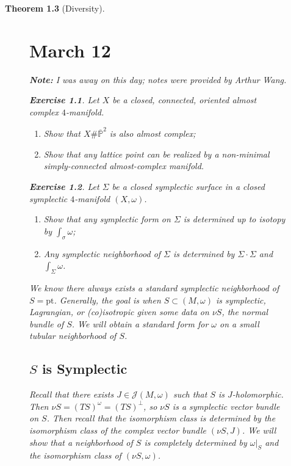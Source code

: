 \documentclass[leqno, openany]{memoir}
\newtheorem{thm}{Theorem}[chapter]
\theoremstyle{definition}
\newtheorem{exer}[thm]{Exercise}
\theoremstyle{remark}
\theoremstyle{plain}
\theoremstyle{definition}
\theoremstyle{remark}
\renewcommand{\P}{\mathbb{P}}
\newcommand{\mc}[1]{\mathcal{#1}}
\newcommand{\mr}[1]{\mathrm{#1}}
\begin{document}
\begin{thm}[Diversity]
\begin{figure}[H]
    \chapter{March 12}%
    
    \textbf{Note:} I was away on this day; notes were provided by Arthur Wang.

    \begin{exer} Let $X$ be a closed, connected, oriented almost complex
        $4$-manifold.  \begin{enumerate} \item Show that $X \# \overline{\P}^2$
            is also almost complex; \item Show that any lattice point can be
            realized by a non-minimal simply-connected almost-complex manifold.
    \end{enumerate} \end{exer}

    \begin{exer} Let $\Sigma$ be a closed symplectic surface in a closed
        symplectic $4$-manifold $(X, \omega)$.  \begin{enumerate} \item Show
            that any symplectic form on $\Sigma$ is determined up to isotopy by
            $\int_{\sigma} \omega$; \item Any symplectic neighborhood of
            $\Sigma$ is determined by $\Sigma \cdot \Sigma$ and $\int_{\Sigma}
            \omega$.  \end{enumerate} \end{exer}

    We know there always exists a standard symplectic neighborhood of $S =
    \mr{pt}$. Generally, the goal is when $S \subset (M, \omega)$ is
    symplectic, Lagrangian, or (co)isotropic given some data on $\nu S$, the
    normal bundle of $S$. We will obtain a standard form for $\omega$ on a
    small tubular neighborhood of $S$.

    \section{$S$ is Symplectic}%
    
    Recall that there exists $J \in \mc{J}(M, \omega)$ such that $S$ is
    $J$-holomorphic. Then $\nu S = (TS)^{\omega} = (TS)^{\perp}$, so $\nu S$ is
    a symplectic vector bundle on $S$. Then recall that the isomorphism class
    is determined by the isomorphism class of the complex vector bundle $(\nu
    S, J)$. We will show that a neighborhood of $S$ is completely determined by
    $\omega |_S$ and the isomorphism class of $(\nu S, \omega)$.
    

\end{figure}
\end{thm}
\end{document}
